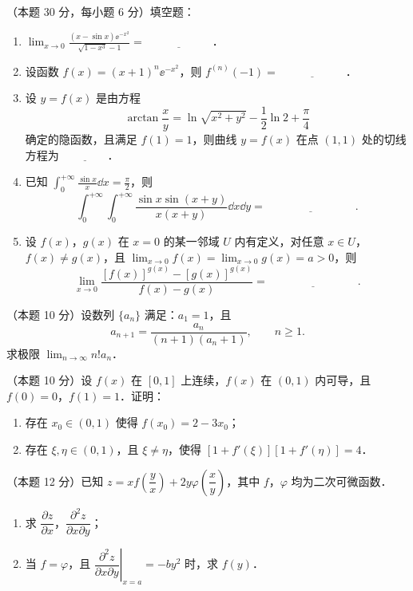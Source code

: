 
\begin{problems}
\item[一、]（本题 30 分，每小题 6 分）填空题：
\begin{enumerate}
  \item $\displaystyle \lim_{x\to 0}\frac{(x-\sin x)\ee^{-x^2}}{\sqrt{1-x^3}-1}=\underline{\hspace{6em}}$．
  \item 设函数 $f(x)=(x+1)^n\ee^{-x^2}$，则 $f^{(n)}(-1)=\underline{\hspace{6em}}$．
  \item 设 $y=f(x)$ 是由方程
  \[
    \arctan\frac{x}{y}=\ln\sqrt{x^2+y^2}-\frac{1}{2}\ln 2+\frac{\pi}{4}
  \]
  确定的隐函数，且满足 $f(1)=1$，则曲线 $y=f(x)$ 在点 $(1,1)$ 处的切线方程为 $\underline{\hspace{4em}}$．
  \item 已知 $\displaystyle \int_0^{+\infty}\frac{\sin x}{x}\dd x=\frac{\pi}{2}$，则
  \[
    \int_0^{+\infty}\int_0^{+\infty}\frac{\sin x\sin(x+y)}{x(x+y)}\dd x\dd y=\underline{\hspace{8em}}.
  \]
  \item 设 $f(x)$，$g(x)$ 在 $x=0$ 的某一邻域 $U$ 内有定义，对任意 $x\in U$，$f(x)\neq g(x)$，且 $\displaystyle \lim_{x\to 0}f(x)=\lim_{x\to 0}g(x)=a>0$，则
  \[
    \lim_{x\to 0}\frac{[f(x)]^{g(x)}-[g(x)]^{g(x)}}{f(x)-g(x)}=\underline{\hspace{8em}}.
  \]
\end{enumerate}

\item[二、]（本题 10 分）设数列 $\{a_n\}$ 满足：$a_1=1$，且
\[
  a_{n+1}=\frac{a_n}{(n+1)(a_n+1)},\qquad n\ge 1.
\]
求极限 $\displaystyle \lim_{n\to\infty}n!a_n$．

\item[三、]（本题 10 分）设 $f(x)$ 在 $[0,1]$ 上连续，$f(x)$ 在 $(0,1)$ 内可导，且 $f(0)=0$，$f(1)=1$．证明：
\begin{enumerate}
  \item 存在 $x_0\in(0,1)$ 使得 $f(x_0)=2-3x_0$；
  \item 存在 $\xi,\eta\in(0,1)$，且 $\xi\neq\eta$，使得 $[1+f'(\xi)][1+f'(\eta)]=4$．
\end{enumerate}

\item[四、]（本题 12 分）已知 $z=xf\left(\dfrac{y}{x}\right)+2y\varphi\left(\dfrac{x}{y}\right)$，其中 $f$，$\varphi$ 均为二次可微函数．
\begin{enumerate}
  \item 求 $\dfrac{\partial z}{\partial x}$，$\dfrac{\partial^2 z}{\partial x\partial y}$；
  \item 当 $f=\varphi$，且 $\left.\dfrac{\partial^2 z}{\partial x\partial y}\right|_{x=a}=-by^2$ 时，求 $f(y)$．
\end{enumerate}


\end{problems}
